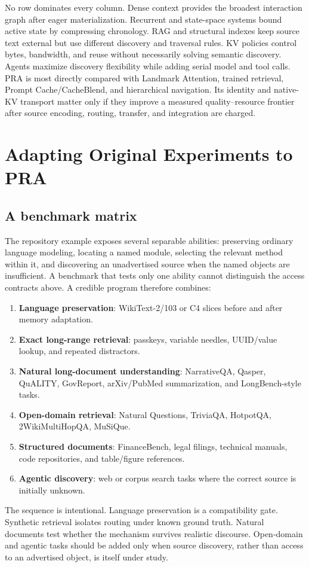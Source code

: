 \documentclass[10pt,a4paper]{article}
\begin{document}
No row dominates every column. Dense context provides the broadest interaction graph after
eager materialization. Recurrent and state-space systems bound active state by compressing
chronology. RAG and structural indexes keep source text external but use different discovery
and traversal rules. KV policies control bytes, bandwidth, and reuse without necessarily
solving semantic discovery. Agents maximize discovery flexibility while adding serial model
and tool calls. PRA is most directly compared with Landmark Attention, trained retrieval,
Prompt Cache/CacheBlend, and hierarchical navigation. Its identity and native-KV transport
matter only if they improve a measured quality--resource frontier after source encoding,
routing, transfer, and integration are charged.

\section{Adapting Original Experiments to PRA}
\subsection{A benchmark matrix}
The repository example exposes several separable abilities: preserving ordinary language
modeling, locating a named module, selecting the relevant method within it, and
discovering an unadvertised source when the named objects are insufficient.  A benchmark
that tests only one ability cannot distinguish the access contracts above.  A credible
program therefore combines:
\begin{enumerate}
\item \textbf{Language preservation}: WikiText-2/103 or C4 slices before and after memory adaptation.
\item \textbf{Exact long-range retrieval}: passkeys, variable needles, UUID/value lookup, and repeated distractors.
\item \textbf{Natural long-document understanding}: NarrativeQA, Qasper, QuALITY, GovReport, arXiv/PubMed summarization, and LongBench-style tasks.
\item \textbf{Open-domain retrieval}: Natural Questions, TriviaQA, HotpotQA, 2WikiMultiHopQA, MuSiQue.
\item \textbf{Structured documents}: FinanceBench, legal filings, technical manuals, code repositories, and table/figure references.
\item \textbf{Agentic discovery}: web or corpus search tasks where the correct source is initially unknown.
\end{enumerate}
The sequence is intentional.  Language preservation is a compatibility gate.  Synthetic
retrieval isolates routing under known ground truth.  Natural documents test whether the
mechanism survives realistic discourse.  Open-domain and agentic tasks should be added
only when source discovery, rather than access to an advertised object, is itself under
study.
\end{document}
